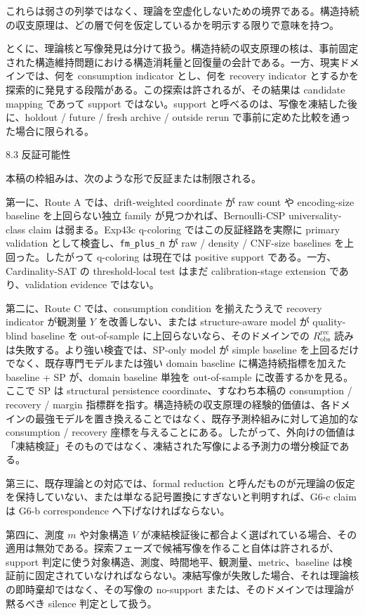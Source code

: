 \documentclass[12pt,a4paper]{article}
\begin{document}
これらは弱さの列挙ではなく、理論を空虚化しないための境界である。構造持続の収支原理は、どの層で何を仮定しているかを明示する限りで意味を持つ。

とくに、理論核と写像発見は分けて扱う。構造持続の収支原理の核は、事前固定された構造維持問題における構造消耗量と回復量の会計である。一方、現実ドメインでは、何を consumption indicator とし、何を recovery indicator とするかを探索的に発見する段階がある。この探索は許されるが、その結果は candidate mapping であって support ではない。support と呼べるのは、写像を凍結した後に、holdout / future / fresh archive / outside rerun で事前に定めた比較を通った場合に限られる。

8.3 反証可能性

本稿の枠組みは、次のような形で反証または制限される。

第一に、Route A では、drift-weighted coordinate が raw count や encoding-size baseline を上回らない独立 family が見つかれば、Bernoulli-CSP universality-class claim は弱まる。Exp43c q-coloring ではこの反証経路を実際に primary validation として検査し、\texttt{fm\_plus\_n} が raw / density / CNF-size baselines を上回った。したがって q-coloring は現在では positive support である。一方、Cardinality-SAT の threshold-local test はまだ calibration-stage extension であり、validation evidence ではない。

第二に、Route C では、consumption condition を揃えたうえで recovery indicator が観測量 \(Y\) を改善しない、または structure-aware model が quality-blind baseline を out-of-sample に上回らないなら、そのドメインでの \(R_{\mathrm{obs}}^{\mathrm{rec}}\) 読みは失敗する。より強い検査では、SP-only model が simple baseline を上回るだけでなく、既存専門モデルまたは強い domain baseline に構造持続指標を加えた baseline + SP が、domain baseline 単独を out-of-sample に改善するかを見る。ここで SP は structural persistence coordinate、すなわち本稿の consumption / recovery / margin 指標群を指す。構造持続の収支原理の経験的価値は、各ドメインの最強モデルを置き換えることではなく、既存予測枠組みに対して追加的な consumption / recovery 座標を与えることにある。したがって、外向けの価値は「凍結検証」そのものではなく、凍結された写像による予測力の増分検証である。

第三に、既存理論との対応では、formal reduction と呼んだものが元理論の仮定を保持していない、または単なる記号置換にすぎないと判明すれば、G6-c claim は G6-b correspondence へ下げなければならない。

第四に、測度 \(m\) や対象構造 \(V\) が凍結検証後に都合よく選ばれている場合、その適用は無効である。探索フェーズで候補写像を作ること自体は許されるが、support 判定に使う対象構造、測度、時間地平、観測量、metric、baseline は検証前に固定されていなければならない。凍結写像が失敗した場合、それは理論核の即時棄却ではなく、その写像の no-support または、そのドメインでは理論が黙るべき silence 判定として扱う。
\end{document}

